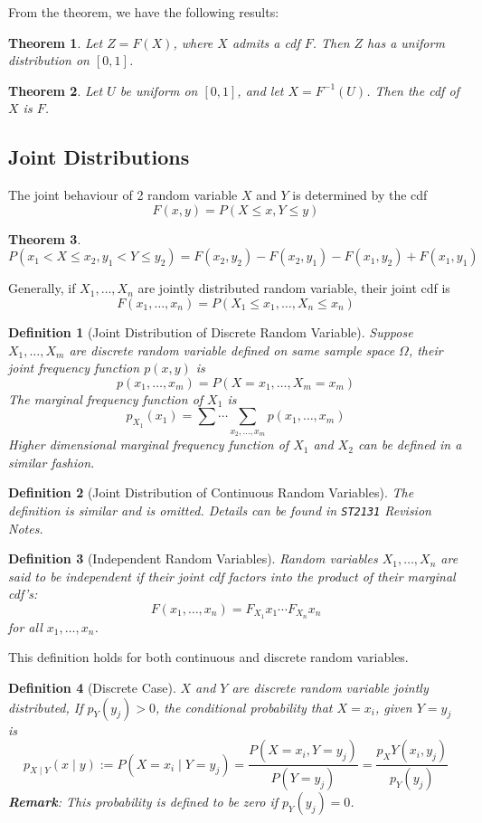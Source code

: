 \documentclass[12pt]{article}
\newtheorem{definition}{Definition}[section]
\newtheorem{theorem}{Theorem}[section]
\theoremstyle{definition}
\begin{document}
From the theorem, we have the following results:
\begin{theorem}
\normalfont Let $Z=F(X)$, where $X$ admits a cdf $F$. Then $Z$ has a uniform distribution on $[0,1]$.
\end{theorem}
\begin{theorem}
\normalfont Let $U$ be uniform on $[0,1]$, and let $X=F^{-1}(U)$. Then the cdf of $X$ is $F$.
\end{theorem}
\subsection{Joint Distributions}
The joint behaviour of 2 random variable $X$ and $Y$ is determined by the cdf
\[
F(x,y) = P(X\leq x, Y\leq y)
\]
\begin{theorem}
\[
P(x_1<X\leq x_2, y_1<Y\leq y_2) = F(x_2, y_2)-F(x_2, y_1)-F(x_1, y_2)+F(x_1, y_1)
\]
\end{theorem}
Generally, if $X_1,\ldots, X_n$ are jointly distributed random variable, their joint cdf is
\[
F(x_1, \ldots, x_n) = P(X_1\leq x_1, \ldots, X_n\leq x_n)
\]
\begin{definition}[Joint Distribution of Discrete Random Variable]
\normalfont Suppose $X_1,\ldots, X_m$ are discrete random variable defined on same sample space $\Omega$, their joint frequency function $p(x,y)$ is
\[
p(x_1, \ldots, x_m) = P(X=x_1,\ldots,  X_m=x_m)
\]
The marginal frequency function of $X_1$ is
\[
p_{X_1}(x_1) = \sum\cdots\sum_{x_2,\ldots,x_m} p(x_1, \ldots, x_m)
\]
Higher dimensional marginal frequency function of $X_1$ and $X_2$ can be defined in a similar fashion.
\end{definition}
\begin{definition}[Joint Distribution of Continuous Random Variables]
\normalfont The definition is similar and is omitted. Details can be found in \texttt{ST2131} Revision Notes.
\end{definition}
\begin{definition}[Independent Random Variables]
\normalfont Random variables $X_1, \ldots, X_n$ are said to be independent if their joint cdf factors into the product of their marginal cdf's:
\[
F(x_1, \ldots, x_n) = F_{X_1}{x_1}\cdots F_{X_n}{x_n}
\]
for all $x_1,\ldots, x_n$.
\end{definition}
This definition holds for both continuous and discrete random variables.
\begin{definition}[Discrete Case]
\normalfont $X$ and $Y$ are discrete random variable jointly distributed, If $p_Y(y_j)>0$, the conditional probability that $X=x_i$, given 
 $Y=y_j$ is
 \[
p_{X\mid Y}(x\mid y) := P(X=x_i\mid Y=y_j) = \frac{P(X=x_i, Y=y_j)}{P(Y=y_j)} = \frac{p_XY(x_i, y_j)}{p_Y(y_j)}
 \]
\textbf{Remark}: This probability is defined to be zero if $p_Y(y_j) = 0$.\\
\end{definition}
\end{document}
